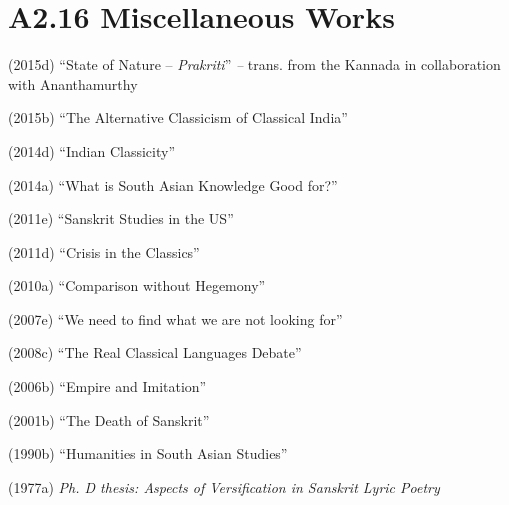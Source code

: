 \vspace{-.3cm}

\section*{A2.16 Miscellaneous Works}

(2015d) “State of Nature – \textit{Prakriti}”\textit{ –} trans. from the Kannada in collaboration with Ananthamurthy

(2015b) “The Alternative Classicism of Classical India”

(2014d) “Indian Classicity”

(2014a) “What is South Asian Knowledge Good for?”

(2011e) “Sanskrit Studies in the US”

(2011d) “Crisis in the Classics”

(2010a) “Comparison without Hegemony”

(2007e) “We need to find what we are not looking for”

(2008c) “The Real Classical Languages Debate”

(2006b) “Empire and Imitation”

(2001b) “The Death of Sanskrit”

(1990b) “Humanities in South Asian Studies”

(1977a) \textit{Ph. D thesis: Aspects of Versification in Sanskrit Lyric Poetry}

